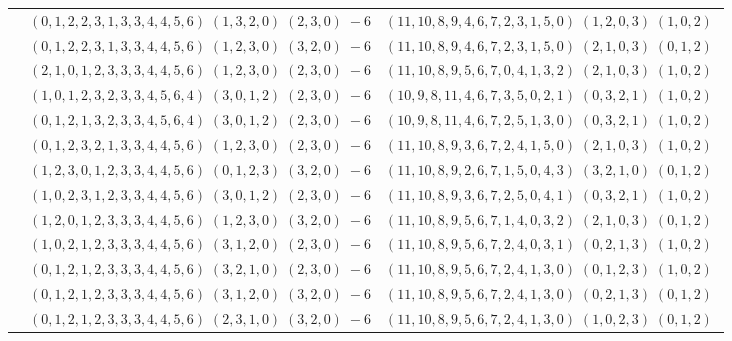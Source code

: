 \documentclass[11pt]{article}
\begin{document}
\begin{longtable}[l]{|c|c|c|}
 \cline{2-3} 
 & $(0 ,1 ,2 ,2 ,3 ,1 ,3 ,3 ,4 ,4 ,5 ,6) \;(1 ,3 ,2 ,0) \;(2 ,3 ,0) \;-6$ & $(11 ,10 ,8 ,9 ,4 ,6 ,7 ,2 ,3 ,1 ,5 ,0) \;(1 ,2 ,0 ,3) \;(1 ,0 ,2) \;$\\ 
 \cline{2-3} 
 & $(0 ,1 ,2 ,2 ,3 ,1 ,3 ,3 ,4 ,4 ,5 ,6) \;(1 ,2 ,3 ,0) \;(3 ,2 ,0) \;-6$ & $(11 ,10 ,8 ,9 ,4 ,6 ,7 ,2 ,3 ,1 ,5 ,0) \;(2 ,1 ,0 ,3) \;(0 ,1 ,2) \;$\\ 
 \cline{2-3} 
 & $(2 ,1 ,0 ,1 ,2 ,3 ,3 ,3 ,4 ,4 ,5 ,6) \;(1 ,2 ,3 ,0) \;(2 ,3 ,0) \;-6$ & $(11 ,10 ,8 ,9 ,5 ,6 ,7 ,0 ,4 ,1 ,3 ,2) \;(2 ,1 ,0 ,3) \;(1 ,0 ,2) \;$\\ 
 \cline{2-3} 
 & $(1 ,0 ,1 ,2 ,3 ,2 ,3 ,3 ,4 ,5 ,6 ,4) \;(3 ,0 ,1 ,2) \;(2 ,3 ,0) \;-6$ & $(10 ,9 ,8 ,11 ,4 ,6 ,7 ,3 ,5 ,0 ,2 ,1) \;(0 ,3 ,2 ,1) \;(1 ,0 ,2) \;$\\ 
 \cline{2-3} 
 & $(0 ,1 ,2 ,1 ,3 ,2 ,3 ,3 ,4 ,5 ,6 ,4) \;(3 ,0 ,1 ,2) \;(2 ,3 ,0) \;-6$ & $(10 ,9 ,8 ,11 ,4 ,6 ,7 ,2 ,5 ,1 ,3 ,0) \;(0 ,3 ,2 ,1) \;(1 ,0 ,2) \;$\\ 
 \cline{2-3} 
 & $(0 ,1 ,2 ,3 ,2 ,1 ,3 ,3 ,4 ,4 ,5 ,6) \;(1 ,2 ,3 ,0) \;(2 ,3 ,0) \;-6$ & $(11 ,10 ,8 ,9 ,3 ,6 ,7 ,2 ,4 ,1 ,5 ,0) \;(2 ,1 ,0 ,3) \;(1 ,0 ,2) \;$\\ 
 \cline{2-3} 
 & $(1 ,2 ,3 ,0 ,1 ,2 ,3 ,3 ,4 ,4 ,5 ,6) \;(0 ,1 ,2 ,3) \;(3 ,2 ,0) \;-6$ & $(11 ,10 ,8 ,9 ,2 ,6 ,7 ,1 ,5 ,0 ,4 ,3) \;(3 ,2 ,1 ,0) \;(0 ,1 ,2) \;$\\ 
 \cline{2-3} 
 & $(1 ,0 ,2 ,3 ,1 ,2 ,3 ,3 ,4 ,4 ,5 ,6) \;(3 ,0 ,1 ,2) \;(2 ,3 ,0) \;-6$ & $(11 ,10 ,8 ,9 ,3 ,6 ,7 ,2 ,5 ,0 ,4 ,1) \;(0 ,3 ,2 ,1) \;(1 ,0 ,2) \;$\\ 
 \cline{2-3} 
 & $(1 ,2 ,0 ,1 ,2 ,3 ,3 ,3 ,4 ,4 ,5 ,6) \;(1 ,2 ,3 ,0) \;(3 ,2 ,0) \;-6$ & $(11 ,10 ,8 ,9 ,5 ,6 ,7 ,1 ,4 ,0 ,3 ,2) \;(2 ,1 ,0 ,3) \;(0 ,1 ,2) \;$\\ 
 \cline{2-3} 
 & $(1 ,0 ,2 ,1 ,2 ,3 ,3 ,3 ,4 ,4 ,5 ,6) \;(3 ,1 ,2 ,0) \;(2 ,3 ,0) \;-6$ & $(11 ,10 ,8 ,9 ,5 ,6 ,7 ,2 ,4 ,0 ,3 ,1) \;(0 ,2 ,1 ,3) \;(1 ,0 ,2) \;$\\ 
 \cline{2-3} 
 & $(0 ,1 ,2 ,1 ,2 ,3 ,3 ,3 ,4 ,4 ,5 ,6) \;(3 ,2 ,1 ,0) \;(2 ,3 ,0) \;-6$ & $(11 ,10 ,8 ,9 ,5 ,6 ,7 ,2 ,4 ,1 ,3 ,0) \;(0 ,1 ,2 ,3) \;(1 ,0 ,2) \;$\\ 
 \cline{2-3} 
 & $(0 ,1 ,2 ,1 ,2 ,3 ,3 ,3 ,4 ,4 ,5 ,6) \;(3 ,1 ,2 ,0) \;(3 ,2 ,0) \;-6$ & $(11 ,10 ,8 ,9 ,5 ,6 ,7 ,2 ,4 ,1 ,3 ,0) \;(0 ,2 ,1 ,3) \;(0 ,1 ,2) \;$\\ 
 \cline{2-3} 
 & $(0 ,1 ,2 ,1 ,2 ,3 ,3 ,3 ,4 ,4 ,5 ,6) \;(2 ,3 ,1 ,0) \;(3 ,2 ,0) \;-6$ & $(11 ,10 ,8 ,9 ,5 ,6 ,7 ,2 ,4 ,1 ,3 ,0) \;(1 ,0 ,2 ,3) \;(0 ,1 ,2) \;$\\ 

\end{longtable}
\end{document}
